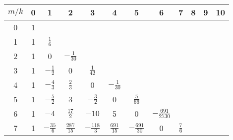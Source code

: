 \begin{table}[H]
    \begin{center}
        \setlength\extrarowheight{-6pt}
        \begin{tabular}{c|ccccccccccc}
            $m/k$ & 0 & 1               & 2                & 3                 & 4                & 5                  & 6                   & 7                    & 8                   & 9                   & 10 \\ [3px]
            \hline
            0     & 1 &                 &                  &                   &                  &                    &                     &                      &                     &                     &                       \\
            1     & 1 & $\frac{1}{6}$   &                  &                   &                  &                    &                     &                      &                     &                     &                       \\
            2     & 1 & 0               & $-\frac{1}{30}$  &                   &                  &                    &                     &                      &                     &                     &                       \\
            3     & 1 & $-\frac{1}{2}$  & 0                & $\frac{1}{42}$    &                  &                    &                     &                      &                     &                     &                       \\
            4     & 1 & $-\frac{4}{3}$  & $\frac{2}{3}$    & 0                 & $-\frac{1}{30}$  &                    &                     &                      &                     &                     &                       \\
            5     & 1 & $-\frac{5}{2}$  & 3                & $-\frac{3}{2}$    & 0                & $\frac{5}{66}$     &                     &                      &                     &                     &                       \\
            6     & 1 & $-4$            & $\frac{17}{2}$   & $-10$             & 5                & 0                  & $-\frac{691}{2730}$ &                      &                     &                     &                       \\
            7     & 1 & $-\frac{35}{6}$ & $\frac{287}{15}$ & $-\frac{118}{3}$  & $\frac{691}{15}$ & $-\frac{691}{30}$ & 0 & $\frac{7}{6}$ &     &     &     \\

\end{tabular}
\end{center}
\end{table}
